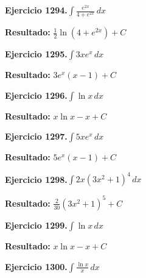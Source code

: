 \documentclass[10pt,a4paper]{article}
\begin{document}
\newpage
\begin{ejbox}
\textbf{Ejercicio 1294.}\quad $\int \frac{e^{2x}}{4+e^{2x}}\,dx$
\end{ejbox}

\begin{solbox}
\textbf{Resultado:} \(\displaystyle \frac{1}{2}\ln(4+e^{2x}) + C\)
\end{solbox}

\begin{ejbox}
\textbf{Ejercicio 1295.}\quad $\int 3x e^{x}\,dx$
\end{ejbox}

\begin{solbox}
\textbf{Resultado:} \(\displaystyle 3e^x(x-1) + C\)
\end{solbox}

\begin{ejbox}
\textbf{Ejercicio 1296.}\quad $\int \ln x\,dx$
\end{ejbox}

\begin{solbox}
\textbf{Resultado:} \(\displaystyle x\ln x - x + C\)
\end{solbox}

\newpage
\begin{ejbox}
\textbf{Ejercicio 1297.}\quad $\int 5x e^{x}\,dx$
\end{ejbox}

\begin{solbox}
\textbf{Resultado:} \(\displaystyle 5e^x(x-1) + C\)
\end{solbox}

\begin{ejbox}
\textbf{Ejercicio 1298.}\quad $\int 2x(3x^2 + 1)^{4}\,dx$
\end{ejbox}

\begin{solbox}
\textbf{Resultado:} \(\displaystyle \frac{2}{30}(3x^2+1)^{5} + C\)
\end{solbox}

\begin{ejbox}
\textbf{Ejercicio 1299.}\quad $\int \ln x\,dx$
\end{ejbox}

\begin{solbox}
\textbf{Resultado:} \(\displaystyle x\ln x - x + C\)
\end{solbox}

\newpage
\begin{ejbox}
\textbf{Ejercicio 1300.}\quad $\int \frac{\ln x}{x}\,dx$
\end{ejbox}
\end{document}
